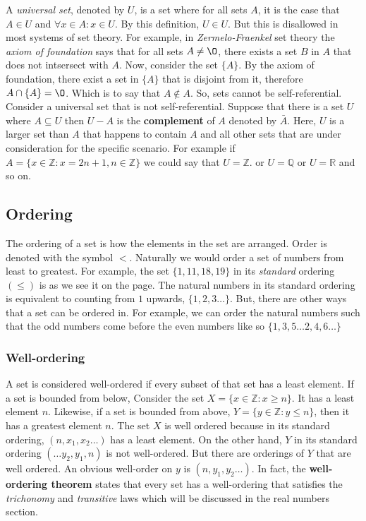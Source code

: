 \documentclass[12pt]{report}
\begin{document}
\hspace{\parindent}A \textit{universal set}, denoted by $U$, is a set where for all sets $A$, it is the case that $A \in U$ and $\forall x \in A: x \in U$. By this definition, $U \in U$. But this is disallowed in most systems of set theory. For example, in \textit{Zermelo-Fraenkel} set theory the \textit{axiom of foundation} says that for all sets $A \neq \O$, there exists a set $B$ in $A$ that does not intsersect with $A$. Now, consider the set $\{A\}$. By the axiom of foundation, there exist a set in $\{A\}$ that is disjoint from it, therefore $A \cap \{A\}= \O$. Which is to say that $A \notin A$. So, sets cannot be self-referential. Consider a universal set that is not self-referential. Suppose that there is a set $U$ where $A \subseteq U$ then $U-A$ is the \textbf{complement} of $A$ denoted by $\bar{A}$. Here, $U$ is a larger set than $A$ that happens to contain $A$ and all other sets that are under consideration for the specific scenario. For example if $A=\{x \in \mathbb{Z}: x = 2n+1, n\in \mathbb{Z}\}$ we could say that $U=\mathbb{Z}$. or $U=\mathbb{Q}$ or $U=\mathbb{R}$ and so on.

\subsection{Ordering}

\hspace*{\parindent}The ordering of a set is how the elements in the set are arranged. Order is denoted with the symbol $<$. Naturally we would order a set of numbers from least to greatest. For example, the set $\{1, 11, 18, 19\}$ in its \textit{standard} ordering $(\leqslant)$ is as we see it on the page. The natural numbers in its standard ordering is equivalent to counting from $1$ upwards, $\{1, 2,3 \dots\}$. But, there are other ways that a set can be ordered in. For example, we can order the natural numbers such that the odd numbers come before the even numbers like so $\{1, 3, 5 \dots 2, 4, 6 \dots \}$

\subsubsection{Well-ordering}

\hspace*{\parindent}A set is considered well-ordered if every subset of that set has a least element. If a set is bounded from below, Consider the set $X=\{x \in \mathbb{Z} : x \geq n\}$. It has a least element $n$. Likewise, if a set is bounded from above, $Y=\{y \in \mathbb{Z} : y \leq n\}$, then it has a greatest element $n$. The set $X$ is well ordered because in its standard ordering, $(n, x_1, x_2 \dots)$ has a least element. On the other hand, $Y$ in its standard ordering $(\dots y_2, y_1, n)$ is not well-ordered. But there are orderings of $Y$ that are well ordered. An obvious well-order on $y$ is $(n, y_1, y_2 \dots)$. In fact, the \textbf{well-ordering theorem} states that every set has a well-ordering that satisfies the \textit{trichonomy} and \textit{transitive} laws which will be discussed in the real numbers section.
\end{document}
